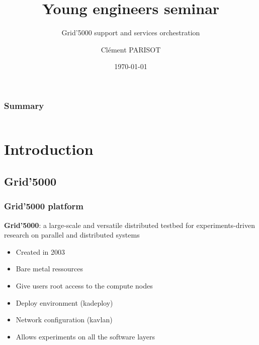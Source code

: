 \documentclass[11pt,compress]{beamer}
\author{Clément PARISOT}
\title{Young engineers seminar}
\subtitle{Grid'5000 support and services orchestration}
\institute{IJD INRIA Nancy\\MADYNES Team\vspace{2.75cm}}
\begin{document}
\date{\scriptsize \today}

{
\begin{frame}[plain]
  \titlepage
\end{frame}
}
\addtocounter{framenumber}{-1}

\begin{frame}
\frametitle{Summary}
\begin{columns}[t]
  \begin{column}{5cm}
  \tableofcontents[sections={1-3},hideothersubsections]
  \end{column}
  \begin{column}{5cm}
  \tableofcontents[sections={4-6},hideothersubsections]
  \end{column}
  \end{columns}
\end{frame}

\section{Introduction}
\subsection{Grid'5000}
\begin{frame}
\frametitle{Grid'5000 platform}
\begin{block}{}
\textbf{Grid'5000}: a large-scale and versatile distributed testbed for experiments-driven research on parallel and distributed systems
\end{block}
\begin{itemize}
\item Created in 2003
\item Bare metal ressources
\item Give users root access to the compute nodes
\item Deploy environment (kadeploy)
\item Network configuration (kavlan)
\item Allows experiments on all the software layers
\end{itemize}
\end{frame}
\end{document}

